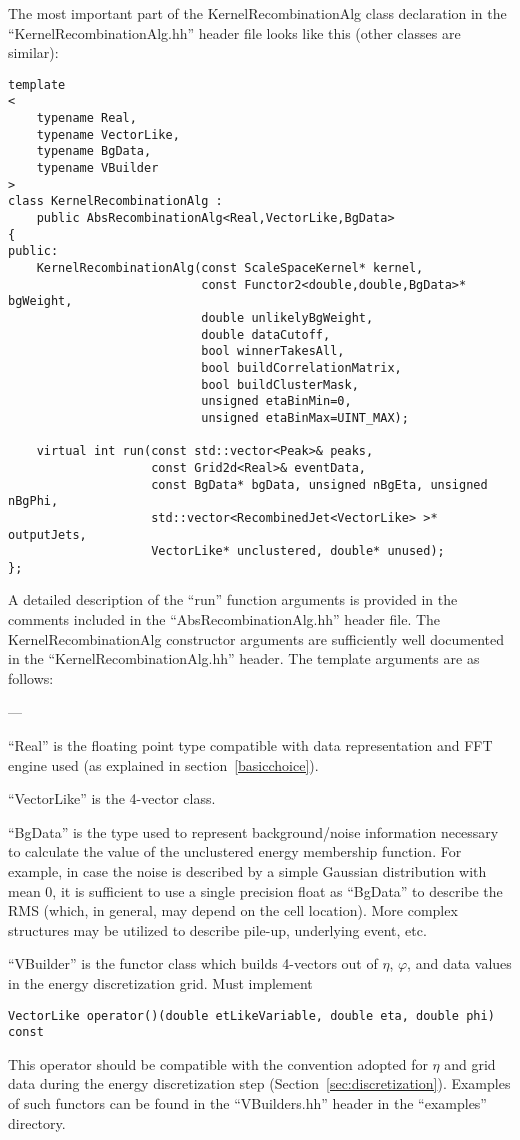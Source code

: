 \documentclass[epsf,12pt,titlepage]{article}
\newcommand{\cname}[1]{\index{#1}\textsf{#1}}
\newenvironment{thinlist} {
    \begin{list} {---} {
        \setlength{\topsep}{0.075cm}
        \setlength{\parsep}{0.075cm}
        \setlength{\itemsep}{0.075cm}
    }
} {\end{list}}
\begin{document}
The most important part of the \cname{KernelRecombinationAlg} class
declaration in the ``KernelRecombinationAlg.hh'' header file
looks like this (other classes are similar):
\begin{verbatim}
template
<
    typename Real,
    typename VectorLike,
    typename BgData,
    typename VBuilder
>
class KernelRecombinationAlg : 
    public AbsRecombinationAlg<Real,VectorLike,BgData>
{
public:
    KernelRecombinationAlg(const ScaleSpaceKernel* kernel,
                           const Functor2<double,double,BgData>* bgWeight,
                           double unlikelyBgWeight,
                           double dataCutoff,
                           bool winnerTakesAll,
                           bool buildCorrelationMatrix,
                           bool buildClusterMask,
                           unsigned etaBinMin=0,
                           unsigned etaBinMax=UINT_MAX);

    virtual int run(const std::vector<Peak>& peaks,
                    const Grid2d<Real>& eventData,
                    const BgData* bgData, unsigned nBgEta, unsigned nBgPhi,
                    std::vector<RecombinedJet<VectorLike> >* outputJets,
                    VectorLike* unclustered, double* unused);
};
\end{verbatim}
A detailed description of the ``run'' function arguments is provided
in the comments included in the ``AbsRecombinationAlg.hh'' header file.
The \cname{KernelRecombinationAlg} constructor arguments are sufficiently
well documented in the ``KernelRecombinationAlg.hh'' header. The template
arguments are as follows:
\begin{thinlist}
\item ``Real'' is the floating point type compatible with data representation
      and FFT engine used (as explained in section~\ref{basicchoice}).
\item ``VectorLike'' is the 4-vector class.
\item ``BgData'' is the type used to represent background/noise information
      necessary to calculate the value of the unclustered energy membership function.
      For example, in case the noise is described by a simple Gaussian
      distribution with mean 0, it is sufficient to use a single precision float
      as ``BgData'' to describe the RMS (which, in general, may depend on the
      cell location). More complex structures may be utilized to describe
      pile-up, underlying event, etc.
\item ``VBuilder'' is the functor class which builds 4-vectors out of
      $\eta$, $\varphi$,
      and data values in the energy discretization grid. Must implement
\begin{verbatim}
VectorLike operator()(double etLikeVariable, double eta, double phi) const
\end{verbatim}
This operator should be compatible with the convention adopted for
$\eta$ and grid data during the energy discretization step
(Section~\ref{sec:discretization}). Examples of such functors can
be found in the ``VBuilders.hh'' header in the ``examples'' directory.
\end{thinlist}
\end{document}
